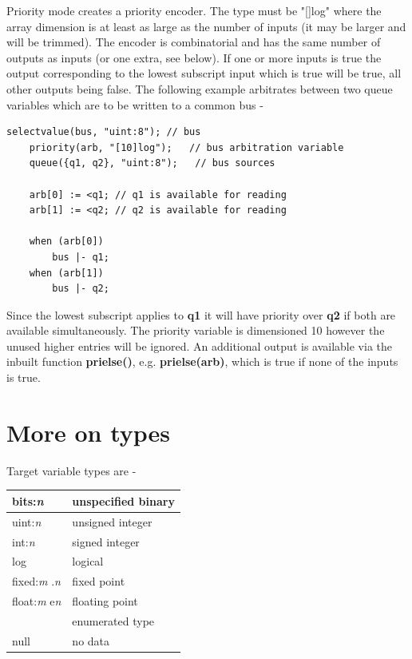 \documentclass[10pt,a4paper,twoside,fleqn]{article}
\newcommand{\var}[1]{{\bf #1}} %
\begin{document}
    Priority mode creates a priority encoder. The type must be "[]log" where the
    array dimension is at least as large as the number of inputs (it may be larger
    and will be trimmed). The encoder is combinatorial and has the same number of
    outputs as inputs (or one extra, see below). If one or more inputs is true the
    output corresponding to the lowest subscript input which is true will be true,
    all other outputs being false. The following example arbitrates between two
    queue variables which are to be written to a common bus -
    \begin{lstlisting}[language=threepl]
    selectvalue(bus, "uint:8"); // bus
    priority(arb, "[10]log");   // bus arbitration variable
    queue({q1, q2}, "uint:8");   // bus sources
    
    arb[0] := <q1; // q1 is available for reading
    arb[1] := <q2; // q2 is available for reading

    when (arb[0])
        bus |- q1;
    when (arb[1])
        bus |- q2;
    \end{lstlisting}
    Since the lowest subscript applies to \var{q1} it will have priority
    over \var{q2} if both are available simultaneously. The priority
    variable is dimensioned 10 however the unused higher entries will be
    ignored. An additional output is available via the inbuilt function
    {\bf prielse()}, e.g. {\bf prielse(arb)}, which is true if none of the inputs
    is true.


\section{More on types}

    Target variable types are -

    \begin{tabular}{| l | l |}
    \hline
    bits:{\em n}           & unspecified binary                 \\ \hline
    uint:{\em n}           & unsigned integer                   \\ \hline
    int:{\em n}            & signed integer                     \\ \hline
    log                    & logical                            \\ \hline
    fixed:{\em m} .{\em n} & fixed point                        \\ \hline
    float:{\em m} e{\em n} & floating point                     \\ \hline
                           & enumerated type                    \\ \hline
    null                   & no data                            \\ \hline
    \end{tabular}
    
\end{document}
